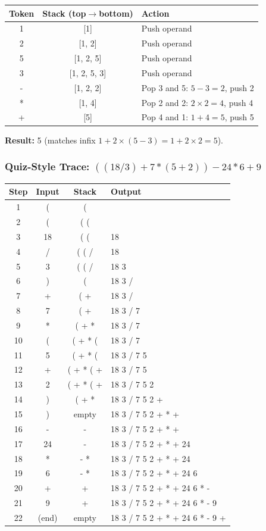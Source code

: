 \documentclass[12pt,portrait]{article}
\begin{document}
\begin{center}
\begin{tabular}{c|c|l}
\toprule
\textbf{Token} & \textbf{Stack (top$\to$bottom)} & \textbf{Action} \\
\midrule
1 & [1] & Push operand \\
2 & [1, 2] & Push operand \\
5 & [1, 2, 5] & Push operand \\
3 & [1, 2, 5, 3] & Push operand \\
- & [1, 2, 2] & Pop 3 and 5: $5-3=2$, push 2 \\
* & [1, 4] & Pop 2 and 2: $2\times2=4$, push 4 \\
+ & [5] & Pop 4 and 1: $1+4=5$, push 5 \\
\bottomrule
\end{tabular}
\end{center}

\textbf{Result:} 5 (matches infix $1 + 2 \times (5 - 3) = 1 + 2\times 2 = 5$).

\subsubsection{Quiz-Style Trace: $((18/3) + 7*(5+2)) - 24*6 + 9$}

\begin{center}
\begin{tabular}{c|c|c|l}
\toprule
\textbf{Step} & \textbf{Input} & \textbf{Stack} & \textbf{Output} \\
\midrule
1 & ( & ( & \\
2 & ( & ( ( & \\
3 & 18 & ( ( & 18 \\
4 & / & ( ( / & 18 \\
5 & 3 & ( ( / & 18 3 \\
6 & ) & ( & 18 3 / \\
7 & + & ( + & 18 3 / \\
8 & 7 & ( + & 18 3 / 7 \\
9 & * & ( + * & 18 3 / 7 \\
10 & ( & ( + * ( & 18 3 / 7 \\
11 & 5 & ( + * ( & 18 3 / 7 5 \\
12 & + & ( + * ( + & 18 3 / 7 5 \\
13 & 2 & ( + * ( + & 18 3 / 7 5 2 \\
14 & ) & ( + * & 18 3 / 7 5 2 + \\
15 & ) & empty & 18 3 / 7 5 2 + * + \\
16 & - & - & 18 3 / 7 5 2 + * + \\
17 & 24 & - & 18 3 / 7 5 2 + * + 24 \\
18 & * & - * & 18 3 / 7 5 2 + * + 24 \\
19 & 6 & - * & 18 3 / 7 5 2 + * + 24 6 \\
20 & + & + & 18 3 / 7 5 2 + * + 24 6 * - \\
21 & 9 & + & 18 3 / 7 5 2 + * + 24 6 * - 9 \\
22 & (end) & empty & 18 3 / 7 5 2 + * + 24 6 * - 9 + \\
\bottomrule
\end{tabular}
\end{center}
\end{document}
